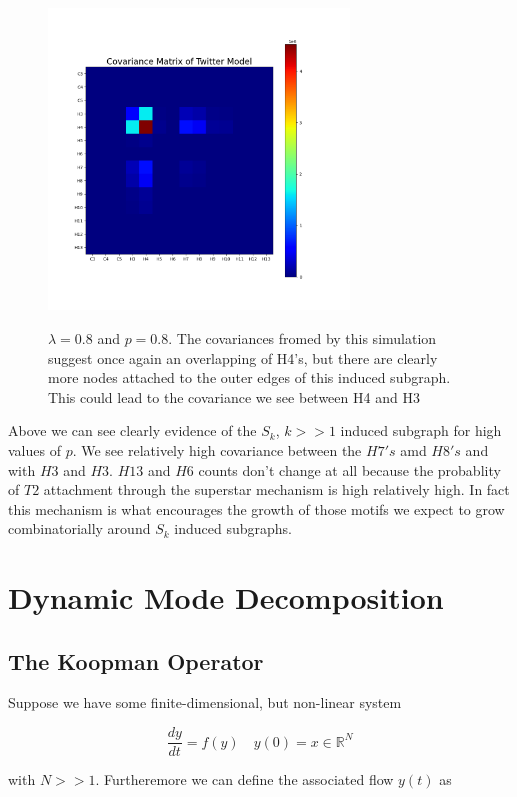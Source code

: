 \begin{figure}
    \includegraphics[width=08cm]{Images/CovMatTwitterModel080809.png}\
    \centering
    \caption{$\lambda=0.8$ and $p=0.8$. The covariances fromed by this simulation suggest once again
    an overlapping of H4's, but there are clearly more nodes attached to the outer edges of this
    induced subgraph. This could lead to the covariance we see between H4 and H3}
\end{figure}

\FloatBarrier

Above we can see clearly evidence of the $S_k$, $k>>1$ induced subgraph
for high values of $p$. We see relatively high covariance between the $H7's$ amd
$H8's$ and with $H3$ and $H3$. $H13$ and $H6$ counts don't change at all because the probablity
of $T2$ attachment through the superstar mechanism is high relatively high. In fact this 
mechanism is what encourages the growth of those motifs we expect to grow combinatorially 
around $S_k$ induced subgraphs.

\chapter{Dynamic Mode Decomposition}

\section{The Koopman Operator}


Suppose we have some finite-dimensional, but non-linear system 

$$
\frac{dy}{dt} = f(y) \quad y(0) = x \in \mathbb{R}^N
$$

with $N>>1$. Furtheremore we can define the associated flow $y(t)$
as 

